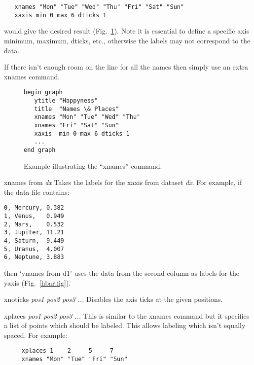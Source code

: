 \begin{commanddescription}
\begin{Verbatim}
   xnames "Mon" "Tue" "Wed" "Thu" "Fri" "Sat" "Sun"
   xaxis min 0 max 6 dticks 1
\end{Verbatim}

would give the desired result (Fig.~\ref{fig:weekday}).  Note it is essential to define a specific axis minimum, maximum, dticks, etc., otherwise the labels may not correspond to the data.

If there isn't enough room on the line for all the names then simply use an extra {\sf xnames} command.

\begin{figure}[tb]
\begin{minipage}[c]{8cm}
\begin{Verbatim}
begin graph
   ytitle "Happyness"
   title  "Names \& Places"
   xnames "Mon" "Tue" "Wed" "Thu"
   xnames "Fri" "Sat" "Sun"
   xaxis  min 0 max 6 dticks 1
   ...
end graph
\end{Verbatim}
\end{minipage}
\hfill
\begin{minipage}[c]{7cm}
\mbox{}
\end{minipage}
\caption{\label{fig:weekday}Example illustrating the ``xnames'' command.}
\end{figure}

\item[{\sf xnames from {\it dx}}]
Takes the labels for the xaxis from dataset {\it dx}. For example, if the data file contains:

\begin{Verbatim}
0, Mercury, 0.382
1, Venus,   0.949
2, Mars,    0.532
3, Jupiter, 11.21
4, Saturn,  9.449
5, Uranus,  4.007
6, Neptune, 3.883
\end{Verbatim}

\noindent{}then `{\sf ynames from d1}' uses the data from the second column as labels for the yaxis (Fig.~\ref{hbar:fig}).

\item[{\sf xnoticks {\it pos1 pos2 pos3 ...}}]
Disables the axis ticks at the given positions.

\item[{\sf xplaces {\it pos1 pos2 pos3 ...}}  ]
This is similar to the xnames command but it specifies a list of points
which should be labeled.  This allows labeling which isn't equally
spaced. For example:

\begin{Verbatim}
     xplaces 1    2     5     7
     xnames "Mon" "Tue" "Fri" "Sun"
\end{Verbatim}


\end{commanddescription}
